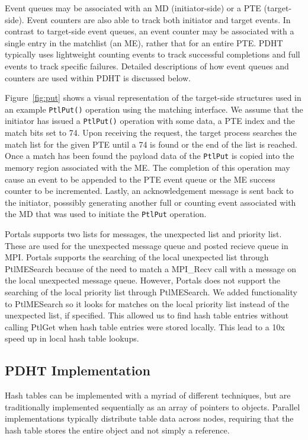 Event queues may be associated with an MD (initiator-side) or a PTE
(target-side). Event counters are also able to track both initiator
and target events. In contrast to target-side event queues, an event
counter may be associated with a single entry in the matchlist (an ME), 
rather that for an entire PTE. PDHT typically uses lightweight counting
events to track successful completions and full events to track specific
failures. Detailed descriptions of how event queues and counters are used
within PDHT is discussed below.

Figure~\ref{fig:put} shows a visual representation of the target-side
structures used in an example {\tt PtlPut()} operation using the matching
interface. We assume that the initiator has issued a {\tt PtlPut()} operation
with some data, a PTE index and the match bits set to 74. Upon receiving the
request, the target process searches the match list for the given PTE until a
74 is found or the end of the list is reached. Once a match has been found the
payload data of the {\tt PtlPut} is copied into the memory region associated
with the ME. The completion of this operation may cause an event to be appended
to the PTE event queue or the ME success counter to be incremented. 
Lastly, an acknowledgement message is sent back to the initiator, posssibly
generating another full or counting event associated with the MD that
was used to initiate the {\tt PtlPut} operation.

Portals supports two lists for messages, the unexpected list and priority list. 
These are used for the unexpected message queue and posted recieve queue in MPI. Portals supports the 
searching of the local unexpected list through PtlMESearch because of the need to match a MPI\_Recv
call with a message on the local unexpected message queue. However, Portals does not support the searching of 
the local priority list through PtlMESearch. We added functionality to PtlMESearch so it looks for matches
on the local priority list instead of the unexpected list, if specified. This allowed us to find hash table entries without 
calling PtlGet when hash table entries were stored locally. This lead to a 10x speed up in local hash table 
lookups.


\subsection{PDHT Implementation}

Hash tables can be implemented with a myriad of different techniques, but are
traditionally implemented sequentially as an array of pointers to objects.
Parallel implementations typically distribute table data across nodes,
requiring that the hash table stores the entire object and not simply a
reference. 


